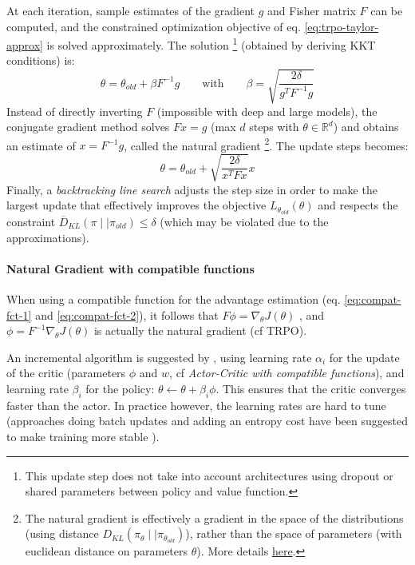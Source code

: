 At each iteration, sample estimates of the gradient $g$ and Fisher matrix $F$ can be computed, and the constrained optimization objective of eq. \ref{eq:trpo-taylor-approx} is solved approximately. The solution
\footnote{This update step does not take into account architectures using dropout or shared parameters between policy and value function.}
(obtained by deriving KKT conditions) is:
\[
    \theta = \theta_{old} + \beta F^{-1} g
    \qquad \text{with} \qquad
    \beta = \sqrt{\frac{2\delta}{g^T F^{-1} g}}
\]
Instead of directly inverting $F$ (impossible with deep and large models), the conjugate gradient method solves $Fx=g$ (max $d$ steps with $\theta \in \mathbb{R}^d$) and obtains an estimate of $x=F^{-1}g$, called the natural gradient
\footnote{The natural gradient is effectively a gradient in the space of the distributions (using distance $D_{KL}(\pi_{\theta}\mid \mid \pi_{\theta_{old}})$), rather than the space of parameters (with euclidean distance on parameters $\theta$). More details \href{https://julien-vitay.net/deeprl/NaturalGradient.html}{here}.}.
The update steps becomes:
\[
    \theta = \theta_{old} + \sqrt{\frac{2\delta}{x^T F x}} x
\]
Finally, a \emph{backtracking line search} adjusts the step size in order to make the largest update that effectively improves the objective $L_{\theta_{old}}(\theta)$ and respects the constraint $\overline{D}_{KL}(\pi\mid \mid \pi_{old}) \leq \delta$ (which may be violated due to the approximations).

\paragraph{Natural Gradient with compatible functions}
When using a compatible function for the advantage estimation (eq. \ref{eq:compat-fct-1} and \ref{eq:compat-fct-2}), it follows that $F \phi = \nabla_\theta J(\theta)$ \demo, and $\phi = F^{-1} \nabla_\theta J(\theta)$ is actually the natural gradient (cf TRPO).

An incremental algorithm is suggested by \cite{bhatnagar2007incremental}, using learning rate $\alpha_i$ for the update of the critic (parameters $\phi$ and $w$, cf \emph{Actor-Critic with compatible functions}), and learning rate $\beta_i$ for the policy: $\theta \leftarrow \theta + \beta_i \phi$. This ensures that the critic converges faster than the actor. In practice however, the learning rates are hard to tune (approaches doing batch updates and adding an entropy cost have been suggested to make training more stable \cite{pajarinen2019compatible}).

